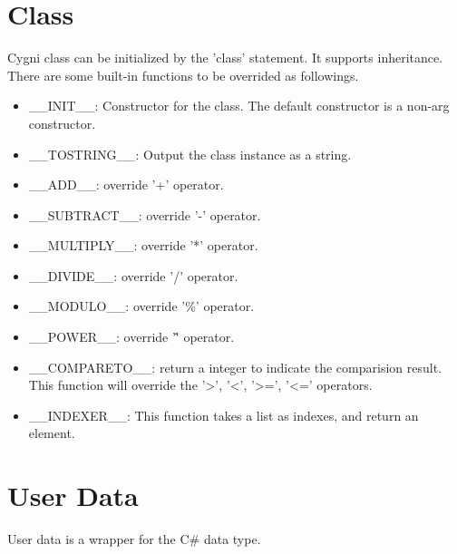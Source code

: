 \section{Class}
Cygni class can be initialized by the 'class' statement. It supports inheritance. There are some built-in functions to be overrided as followings.
\begin{itemize}
	\item \_\_INIT\_\_: Constructor for the class. The default constructor is a non-arg constructor.
	\item \_\_TOSTRING\_\_: Output the class instance as a string.
	\item \_\_ADD\_\_: override '+' operator.
	\item \_\_SUBTRACT\_\_: override '-' operator.
	\item \_\_MULTIPLY\_\_: override '*' operator.
	\item \_\_DIVIDE\_\_: override '/' operator.
	\item \_\_MODULO\_\_: override '\%' operator.
	\item \_\_POWER\_\_: override '\^' operator.
	\item \_\_COMPARETO\_\_: return a integer to indicate the comparision result. This function will override the '>', '<', '>=', '<=' operators.
	\item \_\_INDEXER\_\_: This function takes a list as indexes, and return an element.
\end{itemize}

\section{User Data}
User data is a wrapper for the C\# data type.
